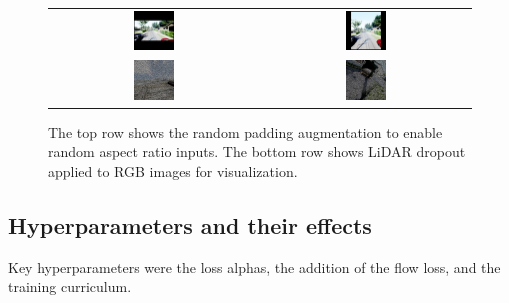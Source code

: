 \documentclass[11pt,a4paper]{article}
\begin{document}
\begin{figure}[h!]
    \centering
    \begin{tabular}{cc} %
        \includegraphics[width=0.2\textwidth]{Reports/4-Final-Report/images/augmentations/pad_1.png} & 
        \includegraphics[width=0.2\textwidth]{Reports/4-Final-Report/images/augmentations/pad_2.png} \\ 
        
        \includegraphics[width=0.2\textwidth]{Reports/4-Final-Report/images/augmentations/dropout_1.png} & 
        \includegraphics[width=0.2\textwidth]{Reports/4-Final-Report/images/augmentations/dropout_2.png} 
    \end{tabular}
    \caption{The top row shows the random padding augmentation to enable random aspect ratio inputs. The bottom row shows LiDAR dropout applied to RGB images for visualization.}
    \label{fig:augmentations}
\end{figure}

\subsection{Hyperparameters and their effects}

Key hyperparameters were the loss alphas, the addition of the flow loss, and the training curriculum.
\end{document}
